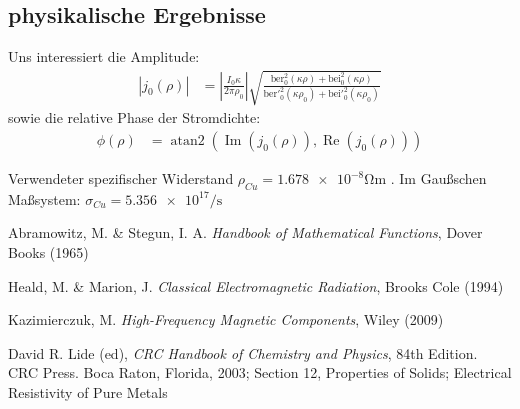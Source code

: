 \documentclass[10pt,a4paper]{article}
\begin{document}
\subsection{physikalische Ergebnisse}
Uns interessiert die Amplitude:
\begin{align}
	|j_0(\rho)| &= \left|\frac{I_0 \kappa}{2 \pi \rho_0}\right|\sqrt{\frac{\mathrm{ber}^2_0(\kappa \rho)+\mathrm{bei}^2_0(\kappa \rho)}{\mathrm{ber}'^2_0(\kappa \rho_0)+\mathrm{bei}'^2_0(\kappa \rho_0)}}
\end{align}
sowie die relative Phase der Stromdichte:
\begin{align}
	\phi(\rho) &= \operatorname{atan2}\left(\operatorname{Im}(j_0(\rho)), \operatorname{Re}(j_0(\rho))\right)
\end{align}

Verwendeter spezifischer Widerstand $\rho_{Cu} = \num{1.678e-8} \si{\ohm\metre}$ \cite{crchandbook}.
Im Gaußschen Maßsystem: $\sigma_{Cu} = \num{5.356e17} \si{\per\second}$




\begin{thebibliography}{9}

Abramowitz, M. \& Stegun, I. A.
\emph{Handbook of Mathematical Functions},
Dover Books (1965)

Heald, M. \& Marion, J.
\emph{Classical Electromagnetic Radiation},
Brooks Cole (1994)

Kazimierczuk, M.
\emph{High-Frequency Magnetic Components},
Wiley (2009)

David R. Lide (ed),
\emph{CRC Handbook of Chemistry and Physics},
84th Edition. CRC Press. Boca Raton, Florida, 2003;
Section 12, Properties of Solids; Electrical Resistivity of Pure Metals

\end{thebibliography}
\end{document}
